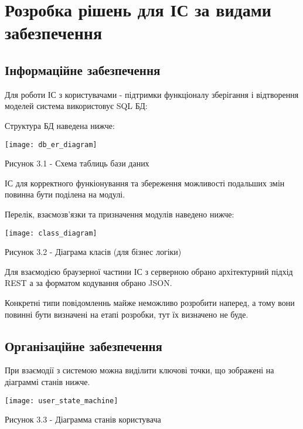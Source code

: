 \chapter{Розробка рішень для ІС за видами забезпечення} 
\label{chap:third}

\section{Інформаційне забезпечення}

Для роботи ІС з користувачами - підтримки функціоналу зберігання і відтворення моделей система використовує SQL БД:

Структура БД наведена нижче:

\begin{center}

\texttt{[image: db\_er\_diagram]}

Рисунок 3.1 - Схема таблиць бази даних
\end{center}

ІС для корректного функіонування та збереження можливості подальших змін повинна бути поділена на модулі.

Перелік, взаємозв'язки та призначення модулів наведено нижче:

\begin{center}

\texttt{[image: class\_diagram]}

Рисунок 3.2 - Діаграма класів (для бізнес логіки)
\end{center}

Для взаємодією браузерної частини ІС з серверною обрано архітектурний підхід REST а за форматом кодування обрано JSON.

Конкретні типи повідомленнь майже неможливо розробити наперед, а тому вони повинні бути визначені на етапі розробки, тут їх визначено не буде.

\section{Організаційне забезпечення}

При взаємодії з системою можна виділити ключові точки, що зображені на діаграммі станів нижче.

\begin{center}

\texttt{[image: user\_state\_machine]}

Рисунок 3.3 - Діаграмма станів користувача
\end{center}

